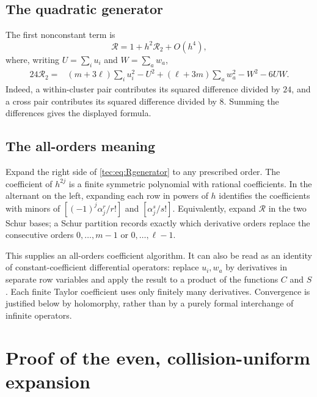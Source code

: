 \documentclass[11pt,a4paper]{article}
\numberwithin{equation}{section}
\theoremstyle{definition}
\theoremstyle{remark}
\begin{document}
\subsection{The quadratic generator}
The first nonconstant term is
\begin{equation}\label{tec:eq:R2}
 \mathcal R=1+h^2\mathcal R_2+O(h^4),
\end{equation}
where, writing $U=\sum_i u_i$ and $W=\sum_aw_a$,
\begin{align}\label{tec:eq:R2closed}
 24\mathcal R_2={}&(m+3\ell)\sum_i u_i^2-U^2
       +(\ell+3m)\sum_a w_a^2-W^2-6UW.
\end{align}
Indeed, a within-cluster pair contributes its squared difference divided
by $24$, and a cross pair contributes its squared difference divided by
$8$. Summing the differences gives the displayed formula.

\subsection{The all-orders meaning}
Expand the right side of \eqref{tec:eq:Rgenerator} to any prescribed order.
The coefficient of $h^{2j}$ is a finite symmetric polynomial with rational
coefficients. In the alternant on the left, expanding each row in powers
of $h$ identifies the coefficients with minors of
$[(-1)^j\alpha_j^r/r!]$ and $[\alpha_j^s/s!]$.
Equivalently, expand $\mathcal R$ in the two Schur bases; a Schur
partition records exactly which derivative orders replace the consecutive
orders $0,\ldots,m-1$ or $0,\ldots,\ell-1$.

This supplies an all-orders coefficient algorithm. It can also be read
as an identity of constant-coefficient differential operators: replace
$u_i,w_a$ by derivatives in separate row variables and apply the result
to a product of the functions $C$ and $S$. Each finite Taylor coefficient
uses only finitely many derivatives. Convergence is justified below by
holomorphy, rather than by a purely formal interchange of infinite
operators.

\section{Proof of the even, collision-uniform expansion}\label{tec:sec:proofmain}
\end{document}
